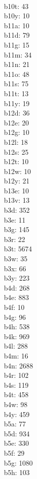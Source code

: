 \begin{multicols}{8}
  \\ b10t: 43
  \\ b10y: 10
  \\ b11a: 10
  \\ b11d: 79
  \\ b11g: 15
  \\ b11m: 34
  \\ b11n: 21
  \\ b11o: 48
  \\ b11s: 75
  \\ b11t: 13
  \\ b11y: 19
  \\ b12d: 36
  \\ b12e: 20
  \\ b12g: 10
  \\ b12l: 18
  \\ b12s: 25
  \\ b12t: 10
  \\ b12w: 10
  \\ b12y: 21
  \\ b13e: 10
  \\ b13v: 13
  \\ b3d: 352
  \\ b3e: 11
  \\ b3g: 145
  \\ b3r: 22
  \\ b3t: 5674
  \\ b3w: 35
  \\ b3x: 66
  \\ b3y: 223
  \\ b4d: 268
  \\ b4e: 883
  \\ b4f: 10
  \\ b4g: 96
  \\ b4h: 538
  \\ b4k: 969
  \\ b4l: 288
  \\ b4m: 16
  \\ b4n: 2688
  \\ b4r: 102
  \\ b4s: 119
  \\ b4t: 458
  \\ b4w: 98
  \\ b4y: 459
  \\ b5a: 77
  \\ b5d: 934
  \\ b5e: 330
  \\ b5f: 29
  \\ b5g: 1080
  \\ b5h: 103

\end{multicols}
